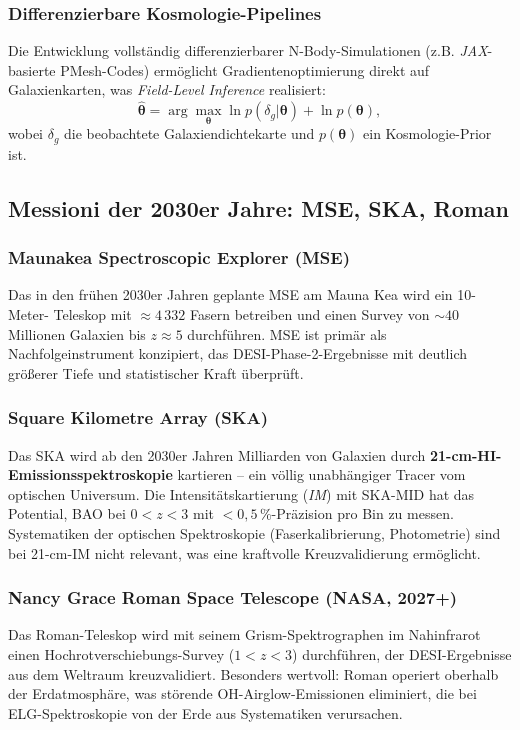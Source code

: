 ﻿\documentclass[a4paper,12pt]{article}
\theoremstyle{definition}
\theoremstyle{remark}
\begin{document}
\subsubsection*{Differenzierbare Kosmologie-Pipelines}
Die Entwicklung vollständig differenzierbarer N-Body-Simulationen (z.B.
\textit{JAX}-basierte PMesh-Codes) ermöglicht Gradientenoptimierung direkt
auf Galaxienkarten, was \textit{Field-Level Inference} realisiert:
\begin{equation}
  \hat{\boldsymbol\theta} = \arg\max_{\boldsymbol\theta}
  \ln p(\delta_g|\boldsymbol\theta) + \ln p(\boldsymbol\theta),
\end{equation}
wobei $\delta_g$ die beobachtete Galaxiendichtekarte und $p(\boldsymbol\theta)$
ein Kosmologie-Prior ist.

\subsection{Messioni der 2030er Jahre: MSE, SKA, Roman}

\subsubsection*{Maunakea Spectroscopic Explorer (MSE)}
Das in den frühen 2030er Jahren geplante MSE am Mauna Kea wird ein 10-Meter-
Teleskop mit $\approx 4\,332$ Fasern betreiben und einen Survey von
$\sim 40$ Millionen Galaxien bis $z \approx 5$ durchführen. MSE ist primär
als Nachfolgeinstrument konzipiert, das DESI-Phase-2-Ergebnisse mit deutlich
größerer Tiefe und statistischer Kraft überprüft.

\subsubsection*{Square Kilometre Array (SKA)}
Das SKA wird ab den 2030er Jahren Milliarden von Galaxien durch
\textbf{21-cm-HI-Emissions\-spektroskopie} kartieren -- ein völlig
unabhängiger Tracer vom optischen Universum. Die Intensitätskartierung
(\textit{IM}) mit SKA-MID hat das Potential, BAO bei $0 < z < 3$ mit
$<0{,}5\,\%$-Präzision pro Bin zu messen. Systematiken der optischen
Spektroskopie (Faserkalibrierung, Photometrie) sind bei 21-cm-IM nicht
relevant, was eine kraftvolle Kreuzvalidierung ermöglicht.

\subsubsection*{Nancy Grace Roman Space Telescope (NASA, 2027+)}
Das Roman-Teleskop wird mit seinem Grism-Spektrographen im Nahinfrarot einen
Hochrot\-verschiebungs-Survey ($1 < z < 3$) durchführen, der DESI-Ergebnisse
aus dem Weltraum kreuzvalidiert. Besonders wertvoll: Roman operiert oberhalb
der Erdatmosphäre, was störende OH-Airglow-Emissionen eliminiert, die bei
ELG-Spektroskopie von der Erde aus Systematiken verursachen.
\end{document}
